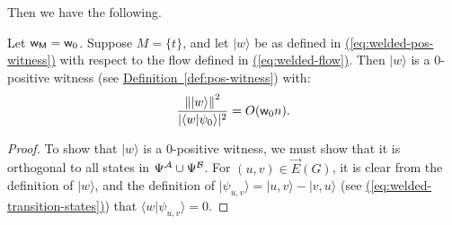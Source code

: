 \documentclass{article}
\newcommand{\eq}[1]{\hyperref[eq:#1]{(\ref*{eq:#1})}}
\newcommand{\defin}[1]{\hyperref[def:#1]{Definition~\ref*{def:#1}}}
\def\ket#1{{\lvert}#1\rangle}
\renewcommand{\>}{\rangle}
\newcommand{\<}{\langle}
\renewcommand{\(}{\left(}
\renewcommand{\)}{\right)}
\def\braket#1#2{{{\langle}#1\vert}#2\rangle}
\def\norm#1{\left\| #1 \right\|}
\def\w{{\sf w}}
\begin{document}
\noindent Then we have the following.
\begin{lemma}\label{lem:welded-pos-analysis}
Let $\w_{\sf M}=\w_0$.
Suppose $M=\{t\}$, and let $\ket{w}$ be as defined in \eq{welded-pos-witness} with respect to the flow defined in \eq{welded-flow}. 
Then $\ket{w}$ is a 0-positive witness (see \defin{pos-witness}) with: 
\begin{equation*}
\frac{\norm{\ket{w}}^2}{|\braket{w}{\psi_0}|^2} = O(\w_0n).
\end{equation*}
\end{lemma}
\begin{proof}
To show that $\ket{w}$ is a 0-positive witness, we must show that it is orthogonal to all states in $\Psi^{\cal A}\cup\Psi^{\cal B}$. For $(u,v)\in\overrightarrow{E}(G)$, it is clear from the definition of $\ket{w}$, and the definition of $\ket{\psi_{u,v}}=\ket{u,v}-\ket{v,u}$ (see \eq{welded-transition-states}) that $\braket{w}{\psi_{u,v}}=0$. 


\end{proof}
\end{document}
